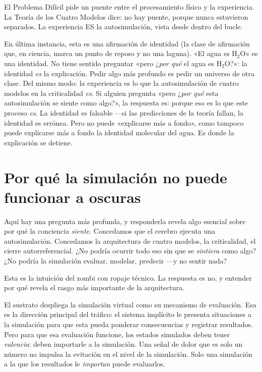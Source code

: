 \documentclass[11pt, twoside, openright]{book}
\begin{document}
El Problema Difícil pide un puente entre el procesamiento físico y la experiencia. La Teoría de los Cuatro Modelos dice: no hay puente, porque nunca estuvieron separados. La experiencia ES la autosimulación, vista desde dentro del bucle.

En última instancia, esta es una afirmación de identidad (la clase de afirmación que, en ciencia, marca un punto de reposo y no una laguna). «El agua es H$_2$O» es una identidad. No tiene sentido preguntar «pero ¿\textit{por qué} el agua es H$_2$O?»: la identidad \textit{es} la explicación. Pedir algo más profundo es pedir un universo de otra clase. Del mismo modo: la experiencia es lo que la autosimulación de cuatro modelos en la criticalidad \textit{es}. Si alguien pregunta «pero ¿\textit{por qué} esta autosimulación se siente como algo?», la respuesta es: porque eso es lo que este proceso \textit{es}. La identidad es falsable ---si las predicciones de la teoría fallan, la identidad es errónea. Pero no puede «explicarse más a fondo», como tampoco puede explicarse más a fondo la identidad molecular del agua. Es donde la explicación se detiene.

\section*{Por qué la simulación no puede funcionar a oscuras}

Aquí hay una pregunta más profunda, y responderla revela algo esencial sobre por qué la conciencia \textit{siente}. Concedamos que el cerebro ejecuta una autosimulación. Concedamos la arquitectura de cuatro modelos, la criticalidad, el cierre autorreferencial. ¿No podría ocurrir todo eso sin que se \textit{sintiera} como algo? ¿No podría la simulación evaluar, modelar, predecir ---y no sentir nada?

Esta es la intuición del zombi con ropaje técnico. La respuesta es no, y entender por qué revela el rasgo más importante de la arquitectura.

El sustrato despliega la simulación virtual como su mecanismo de evaluación. Esa es la dirección principal del tráfico: el sistema implícito le presenta situaciones a la simulación para que esta pueda ponderar consecuencias y registrar resultados. Pero para que esa evaluación funcione, los estados simulados deben tener \textit{valencia}: deben importarle a la simulación. Una señal de dolor que es solo un número no impulsa la evitación en el nivel de la simulación. Solo una simulación a la que los resultados le \textit{importan} puede evaluarlos.
\end{document}
